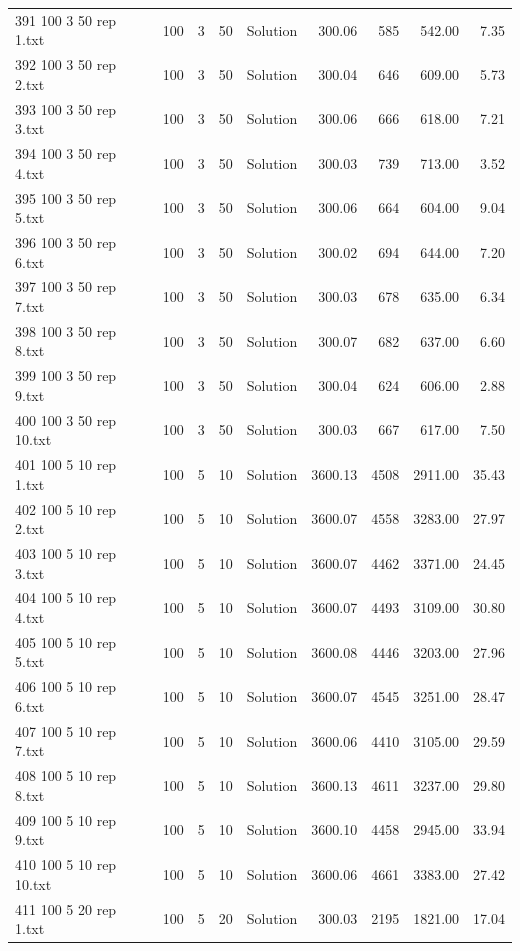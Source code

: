 \begin{longtable}{lrrllrrrr}
391 100 3 50 rep 1.txt & 100 & 3 & 50 & Solution & 300.06 & 585 & 542.00 &  7.35\\
392 100 3 50 rep 2.txt & 100 & 3 & 50 & Solution & 300.04 & 646 & 609.00 &  5.73\\
393 100 3 50 rep 3.txt & 100 & 3 & 50 & Solution & 300.06 & 666 & 618.00 &  7.21\\
394 100 3 50 rep 4.txt & 100 & 3 & 50 & Solution & 300.03 & 739 & 713.00 &  3.52\\
395 100 3 50 rep 5.txt & 100 & 3 & 50 & Solution & 300.06 & 664 & 604.00 &  9.04\\
396 100 3 50 rep 6.txt & 100 & 3 & 50 & Solution & 300.02 & 694 & 644.00 &  7.20\\
397 100 3 50 rep 7.txt & 100 & 3 & 50 & Solution & 300.03 & 678 & 635.00 &  6.34\\
398 100 3 50 rep 8.txt & 100 & 3 & 50 & Solution & 300.07 & 682 & 637.00 &  6.60\\
399 100 3 50 rep 9.txt & 100 & 3 & 50 & Solution & 300.04 & 624 & 606.00 &  2.88\\
400 100 3 50 rep 10.txt & 100 & 3 & 50 & Solution & 300.03 & 667 & 617.00 &  7.50\\
401 100 5 10 rep 1.txt & 100 & 5 & 10 & Solution & 3600.13 & 4508 & 2911.00 & 35.43\\
402 100 5 10 rep 2.txt & 100 & 5 & 10 & Solution & 3600.07 & 4558 & 3283.00 & 27.97\\
403 100 5 10 rep 3.txt & 100 & 5 & 10 & Solution & 3600.07 & 4462 & 3371.00 & 24.45\\
404 100 5 10 rep 4.txt & 100 & 5 & 10 & Solution & 3600.07 & 4493 & 3109.00 & 30.80\\
405 100 5 10 rep 5.txt & 100 & 5 & 10 & Solution & 3600.08 & 4446 & 3203.00 & 27.96\\
406 100 5 10 rep 6.txt & 100 & 5 & 10 & Solution & 3600.07 & 4545 & 3251.00 & 28.47\\
407 100 5 10 rep 7.txt & 100 & 5 & 10 & Solution & 3600.06 & 4410 & 3105.00 & 29.59\\
408 100 5 10 rep 8.txt & 100 & 5 & 10 & Solution & 3600.13 & 4611 & 3237.00 & 29.80\\
409 100 5 10 rep 9.txt & 100 & 5 & 10 & Solution & 3600.10 & 4458 & 2945.00 & 33.94\\
410 100 5 10 rep 10.txt & 100 & 5 & 10 & Solution & 3600.06 & 4661 & 3383.00 & 27.42\\
411 100 5 20 rep 1.txt & 100 & 5 & 20 & Solution & 300.03 & 2195 & 1821.00 & 17.04\\

\end{longtable}
